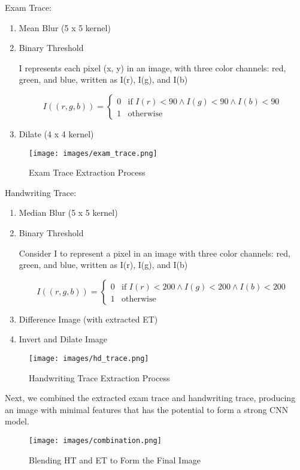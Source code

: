 \documentclass[pmlr,twocolumn,10pt]{jmlr} %
\begin{document}
Exam Trace:

\begin{enumerate}
\item Mean Blur (5 x 5 kernel)
\item Binary Threshold

I represents each pixel (x, y) in an image, with three color channels: red, green, and blue, written as I(r), I(g), and I(b)

\[I((r, g, b)) = \begin{cases} 
    0 & \text{if } I(r) < 90 \land I(g) < 90 \land I(b) < 90 \\
    1 & \text{otherwise}
\end{cases}\]

\item Dilate (4 x 4 kernel)
\end{enumerate}

\begin{figure}[h] 
\label{fig: fig2}
\centering 
\texttt{[image: images/exam\_trace.png]}
\caption{Exam Trace Extraction Process}
\end{figure}

\vfill\null
\columnbreak

Handwriting Trace:

\begin{enumerate}
\item Median Blur (5 x 5 kernel)
\item Binary Threshold

Consider I to represent a pixel in an image with three color channels: red, green, and blue, written as I(r), I(g), and I(b)

\[I((r, g, b)) = \begin{cases} 
    0 & \text{if } I(r) < 200 \land I(g) < 200 \land I(b) < 200 \\
    1 & \text{otherwise}
\end{cases}\]

\item Difference Image (with extracted ET)
\item Invert and Dilate Image
\end{enumerate}

\begin{figure}[h] 
\label{fig: fig3}
\centering 
\texttt{[image: images/hd\_trace.png]}
\caption{Handwriting Trace Extraction Process}
\end{figure}

\clearpage

Next, we combined the extracted exam trace and handwriting trace, producing an image with minimal features that has the potential to form a strong CNN model.

\begin{figure} [h]
\label{fig:fig4}
\centering 
\texttt{[image: images/combination.png]}
\caption{Blending HT and ET to Form the Final Image}
\end{figure}
\end{document}
